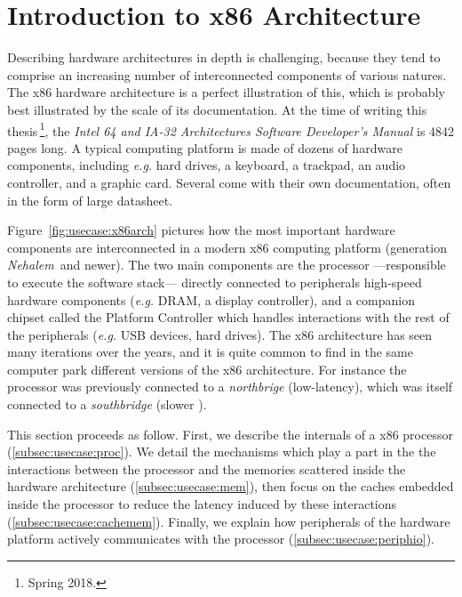 \section{Introduction to x86 Architecture}
\label{sec:usecase:architecture}

Describing hardware architectures in depth is challenging, because they tend to
comprise an increasing number of interconnected components of various natures.
%
The x86 hardware architecture is a perfect illustration of this, which is
probably best illustrated by the scale of its documentation.
%
At the time of writing this thesis\,\footnote{Spring 2018.}, the \emph{Intel 64
  and IA-32 Architectures Software Developer’s Manual} is 4842 pages long.
%
A typical computing platform is made of dozens of hardware components, including
\emph{e.g.} hard drives, a keyboard, a trackpad, an audio controller, and a
graphic card.
%
Several come with their own documentation, often in the form of large datasheet.

Figure~\ref{fig:usecase:x86arch} pictures how the most important hardware
components are interconnected in a modern x86 computing platform (generation
\emph{Nehalem}\,\cite{thomadakis2011nehalem} and newer).
%
The two main components are the processor ---responsible to execute the software
stack--- directly connected to peripherals high-speed hardware components
(\emph{e.g.}  DRAM, a display controller), and a companion chipset called the
Platform Controller which handles interactions with the rest of the peripherals
(\emph{e.g.} USB devices, hard drives).
%
The x86 architecture has seen many iterations over the years, and it is quite
common to find in the same computer park different versions of the x86
architecture.
%
For instance the processor was previously connected to a \emph{northbrige}
(low-latency), which was itself connected to a \emph{southbridge} (slower \IOs).

This section proceeds as follow.
%
First, we describe the internals of a x86 processor (\ref{subsec:usecase:proc}).
%
We detail the mechanisms which play a part in the the interactions between the
processor and the memories scattered inside the hardware architecture
(\ref{subsec:usecase:mem}), then focus on the caches embedded inside the
processor to reduce the latency induced by these interactions
(\ref{subsec:usecase:cachemem}).
%
Finally, we explain how peripherals of the hardware platform actively
communicates with the processor (\ref{subsec:usecase:periphio}).

